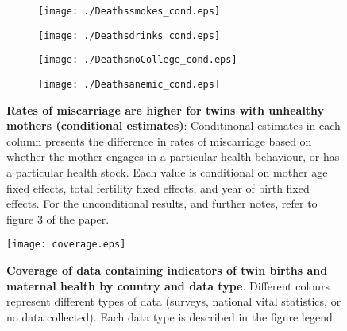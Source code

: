 \documentclass{nature}
\begin{document}
\begin{linenumbers}
\begin{spacing}{1}
\begin{figure}[htpb!]
\begin{subfigure}{.5\textwidth}
  \texttt{[image: ./Deathssmokes\_cond.eps]}
\end{subfigure}%
\begin{subfigure}{.5\textwidth}
  \texttt{[image: ./Deathsdrinks\_cond.eps]}
\end{subfigure}
\begin{subfigure}{.5\textwidth}
  \texttt{[image: ./DeathsnoCollege\_cond.eps]}
\end{subfigure}%
\begin{subfigure}{.5\textwidth}
  \texttt{[image: ./Deathsanemic\_cond.eps]}
\end{subfigure}
\vspace{5mm}
\caption{\textbf{Rates of miscarriage are higher for twins with unhealthy mothers (conditional estimates)}: {\footnotesize Conditinonal estimates in each column presents the difference in rates of miscarriage based on whether the mother engages in a particular health behaviour, or has a particular health stock.  Each value is conditional on mother age fixed effects, total fertility fixed effects, and year of birth fixed effects.  For the unconditional results, and further notes, refer to figure 3 of the paper.}}
\label{fig:miscarraigeCond}
\end{figure}

\begin{figure}[htpb!]
\texttt{[image: coverage.eps]}
\caption{\textbf{Coverage of data containing indicators of twin births and maternal health by country and data type}. {\footnotesize  Different colours represent different types of data (surveys, national vital statistics, or no data collected).  Each data type is described in the figure legend.}}
\label{fig:twincoverage}
\end{figure}


\end{spacing}
\end{linenumbers}
\end{document}
